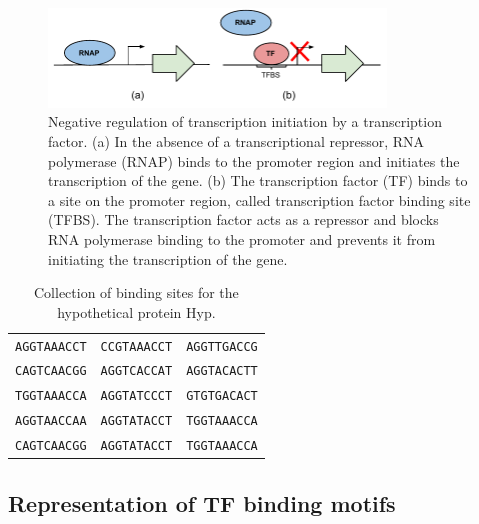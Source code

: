 \begin{figure}
  \centering
  \includegraphics[width=0.8\textwidth]{figures/chapter1/tf_binding}
  \caption[Negative regulation of transcription initation by a transcription
  factor.]{Negative regulation of transcription initiation by a transcription
    factor. (a) In the absence of a transcriptional repressor, RNA polymerase
    (RNAP) binds to the promoter region and initiates the transcription of the
    gene. (b) The transcription factor (TF) binds to a site on the promoter
    region, called transcription factor binding site (TFBS). The transcription
    factor acts as a repressor and blocks RNA polymerase binding to the
    promoter and prevents it from initiating the transcription of the gene.}
  \label{fig:tf-binding}
\end{figure}

\begin{table}[h]
  \centering
  \caption{Collection of binding sites for the hypothetical protein Hyp.}
  \label{tab:lexa-motif}
  \begin{tabular}{c c c}
\texttt{AGGTAAACCT} & \texttt{CCGTAAACCT} & \texttt{AGGTTGACCG}\\
\texttt{CAGTCAACGG} & \texttt{AGGTCACCAT} & \texttt{AGGTACACTT}\\
\texttt{TGGTAAACCA} & \texttt{AGGTATCCCT} & \texttt{GTGTGACACT}\\
\texttt{AGGTAACCAA} & \texttt{AGGTATACCT} & \texttt{TGGTAAACCA}\\
\texttt{CAGTCAACGG} & \texttt{AGGTATACCT} & \texttt{TGGTAAACCA}
   \end{tabular}
\end{table}


\subsection{Representation of TF binding motifs}

